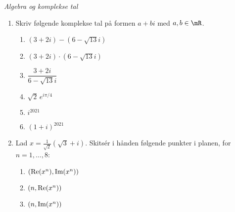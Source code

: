 \begin{opg} \emph{Algebra og komplekse tal}
\begin{enumerate}
    \item Skriv følgende komplekse tal på formen $a+ bi$ med $a, b \in \mR$.
    \begin{multicols}{3}
    \begin{enumerate}[label=\roman*)]
        \item $(3+2i)-(6- \sqrt{13} i)$
	    \item $(3+2i) \cdot (6- \sqrt{13} i)$ 
		\item  $\dfrac{3+2i}{6- \sqrt{13} i}$ 
	    \item $\sqrt{2}\, e^{i \pi /4}$
		\item  $i^{2021}$
	    \item $(1+i)^{2021}$
    \end{enumerate}
    \end{multicols}
    
%
%    
    \item Lad $x=\frac 1{\sqrt 2}(\sqrt{3}+ i)$. Skitsér i hånden følgende punkter i planen, for $n=1,\dots,8$:
    \begin{multicols}{3}
    \begin{enumerate}[label=\roman*)]
        \item $(\textup{Re}(x^n),\text{Im}(x^n))$
        \item $(n,\textup{Re}(x^n))$
        \item $(n,\textup{Im}(x^n))$
    \end{enumerate}
    \end{multicols}
\end{enumerate}
\end{opg}
